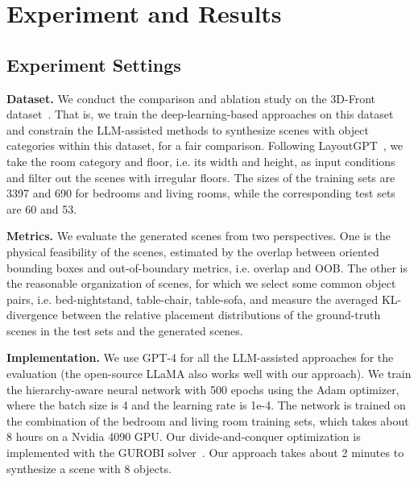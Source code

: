 \section{Experiment and Results}


\subsection{Experiment Settings}

\noindent\textbf{Dataset.} We conduct the comparison and ablation study on the 3D-Front dataset~\cite{fu20213d}. That is, we train the deep-learning-based approaches on this dataset and constrain the LLM-assisted methods to synthesize scenes with object categories within this dataset, for a fair comparison. Following LayoutGPT~\cite{Feng2023LayoutGPTCV}, we take the room category and floor, i.e. its width and height, as input conditions and filter out the scenes with irregular floors. The sizes of the training sets are 3397 and 690 for bedrooms and living rooms, while the corresponding test sets are 60 and 53.

\noindent\textbf{Metrics.} We evaluate the generated scenes from two perspectives. One is the physical feasibility of the scenes, estimated by the overlap between oriented bounding boxes and out-of-boundary metrics, i.e. overlap and OOB. The other is the reasonable organization of scenes, for which we select some common object pairs, i.e. bed-nightstand, table-chair, table-sofa, and measure the averaged KL-divergence between the relative placement distributions of the ground-truth scenes in the test sets and the generated scenes.

\noindent\textbf{Implementation.} We use GPT-4\cite{achiam2023gpt} for all the LLM-assisted approaches for the evaluation (the open-source LLaMA also works well with our approach). We train the hierarchy-aware neural network with 500 epochs using the Adam optimizer, where the batch size is 4 and the learning rate is 1e-4. The network is trained on the combination of the bedroom and living room training sets, which takes about 8 hours on a Nvidia 4090 GPU. Our divide-and-conquer optimization is implemented with the GUROBI solver~\cite{gurobi}. Our approach takes about 2 minutes to synthesize a scene with 8 objects.  


